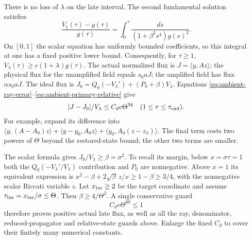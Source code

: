 There is no loss of $\lambda$ on the late interval.
The second fundamental solution satisfies
\[
 \frac{V_1(\tau)-g(\tau)}{g(\tau)}
   =\int_0^\tau\frac{ds}{(1+\beta^2s^4)g(s)^2}.
\]
On $[0,1]$ the scalar equation has uniformly bounded coefficients,
so this integral at one has a fixed positive lower bound.
Consequently, for $\tau\geq1$,
$V_\lambda(\tau)\geq c(1+\lambda)g(\tau)$.
The actual normalized flux is $J=\langle y,Az\rangle$; the physical
flux for the unamplified field equals $s_0aJ$; the amplified field has
flux $\alpha s_0aJ$.
The ideal flux is
$J_0=Q_0(-V_\lambda')+(P_0+\beta)V_\lambda$.
Equations \eqref{eq:ambient-ray-error}--\eqref{eq:ambient-primary-relative}
give
\begin{equation}\label{eq:ambient-flux-relative}
 |J-J_0|/V_\lambda\leq C_de\Theta^{34}
 \quad(1\leq\tau\leq\tau_{\rm end}).
\end{equation}
For example, expand its difference into
$\langle y,(A-A_0)z\rangle+
 \langle y-y_0,A_0z\rangle+
 \langle y_0,A_0(z-z_\lambda)\rangle$.
The final term costs two powers of $\Theta$ beyond the restored-state
bound; the other two terms are smaller.

The scalar formula gives $J_0/V_\lambda\geq\beta=\sigma^2$.
To recall its margin, below $x=\sigma\tau=1$ both the
$Q_0(-V_\lambda'/V_\lambda)$ contribution and $P_0$ are nonnegative.
Above $x=1$ its equivalent expression is
$x^2-\beta+2\sqrt\beta\,z/x\geq1-\beta\geq3/4$, with the
nonnegative scalar Riccati variable $z$.
Let $x_{\rm tar}\geq2$ be the target coordinate and assume
$\tau_{\rm tar}=x_{\rm tar}/\sigma\leq\Theta$.
Then $\beta\geq4/\Theta^2$.
A single conservative guard
\begin{equation}\label{eq:ambient-sixty-guard}
 C_de\Theta^{60}\leq1
\end{equation}
therefore proves positive actual late flux, as well as all the ray,
denominator, reduced-propagator and relative-state guards above.
Enlarge the fixed $C_d$ to cover their finitely many numerical constants.

